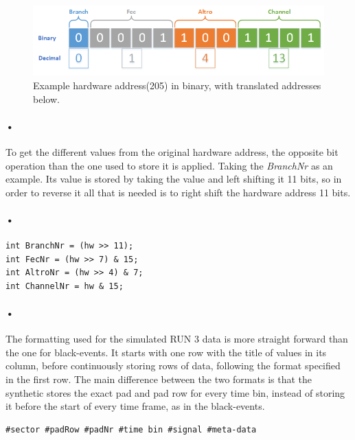 \documentclass[a4paper, 12pt, openright, twoside]{report}
\begin{document}
\begin{figure}[h!]
	\centering
		\includegraphics[width=1.0\textwidth]{images/hw-binary.png}
		\caption{Example hardware address(205) in binary, with translated addresses below.}
		\label{fig:hw-binary}
\end{figure}

\paragraph{•}
To get the different values from the original hardware address, the opposite bit operation than the one used to store it is applied.
Taking the \textit{BranchNr} as an example.
Its value is stored by taking the value and left shifting it 11 bits, so in order to reverse it all that is needed is to right shift the hardware address 11 bits.
\paragraph{•}
\begin{minipage}{\linewidth}
\begin{lstlisting}[caption=Bitwise operation to retrieve values from the hardware address., label=lst:bit-operation]
int BranchNr = (hw >> 11);
int FecNr = (hw >> 7) & 15;
int AltroNr = (hw >> 4) & 7;
int ChannelNr = hw & 15;
\end{lstlisting}
\end{minipage}

\paragraph{•}
The formatting used for the simulated RUN 3 data is more straight forward than the one for black-events.
It starts with one row with the title of values in its column, before continuously storing rows of data, following the format specified in the first row.
The main difference between the two formats is that the synthetic stores the exact pad and pad row for every time bin, instead of storing it before the start of every time frame, as in the black-events.

\begin{lstlisting}[caption=Format for the simulated RUN 3 dataset., label=lst:synthetic-data-format]
#sector #padRow #padNr #time bin #signal #meta-data
\end{lstlisting}
\end{document}

